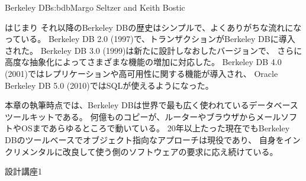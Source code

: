 \begin{aosachapter}{Berkeley DB}{s:bdb}{Margo Seltzer and Keith Bostic}
\begin{aosasect1}{はじまり}
それ以降のBerkeley DBの歴史はシンプルで、よくありがちな流れになっている。
Berkeley DB 2.0 (1997)で、トランザクションがBerkeley DBに導入された。
Berkeley DB 3.0 (1999)は新たに設計しなおしたバージョンで、
さらに高度な抽象化によってさまざまな機能の増加に対応した。
Berkeley DB 4.0 (2001)ではレプリケーションや高可用性に関する機能が導入され、
Oracle Berkeley DB 5.0 (2010)ではSQLが使えるようになった。

本章の執筆時点では、Berkeley DBは世界で最も広く使われているデータベースツールキットである。
何億ものコピーが、ルーターやブラウザからメールソフトやOSまであらゆるところで動いている。
20年以上たった現在でもBerkeley DBのツールベースでオブジェクト指向なアプローチは現役であり、
自身をインクリメンタルに改良して使う側のソフトウェアの要求に応え続けている。

\begin{aosabox}{設計講座1}


\end{aosabox}
\end{aosasect1}
\end{aosachapter}
